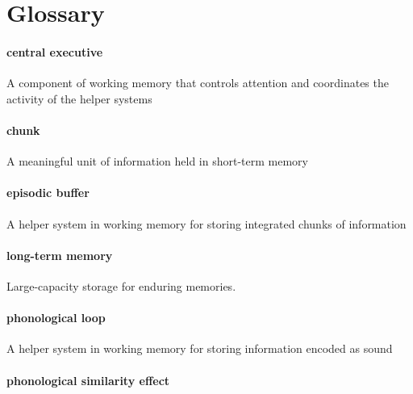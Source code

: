 \documentclass[
]{krantz}
\begin{document}
\section{Glossary}\label{glossary-3}

\paragraph*{central executive}\label{central-executive}

A component of working memory that controls attention and coordinates the activity of the helper systems

\paragraph*{chunk}\label{chunk}

A meaningful unit of information held in short-term memory

\paragraph*{episodic buffer}\label{episodic-buffer}

A helper system in working memory for storing integrated chunks of information

\paragraph*{long-term memory}\label{long-term-memory}

Large-capacity storage for enduring memories.

\paragraph*{phonological loop}\label{phonological-loop}

A helper system in working memory for storing information encoded as sound

\paragraph*{phonological similarity effect}\label{phonological-similarity-effect}
\end{document}

